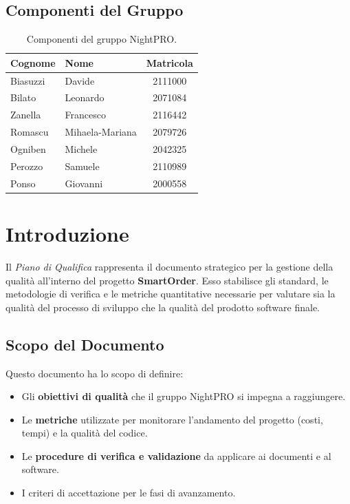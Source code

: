 \documentclass[a4paper,11pt,oneside]{scrartcl}
\begin{document}
\subsection*{Componenti del Gruppo}

\begin{table}[h!]
\centering
\renewcommand{\arraystretch}{1.2}
\begin{tabular}{@{}llc@{}}
\toprule
\textbf{Cognome} & \textbf{Nome} & \textbf{Matricola} \\
\midrule
Biasuzzi & Davide & 2111000 \\
Bilato & Leonardo & 2071084 \\
Zanella & Francesco & 2116442 \\
Romascu & Mihaela-Mariana & 2079726 \\
Ogniben & Michele & 2042325 \\
Perozzo & Samuele & 2110989 \\
Ponso & Giovanni & 2000558 \\
\bottomrule
\end{tabular}
\caption{Componenti del gruppo NightPRO.}
\end{table}

\newpage
\section{Introduzione}

Il \textit{Piano di Qualifica} rappresenta il documento strategico per la gestione della qualità all'interno del progetto \textbf{SmartOrder}. Esso stabilisce gli standard, le metodologie di verifica e le metriche quantitative necessarie per valutare sia la qualità del processo di sviluppo che la qualità del prodotto software finale.

\subsection{Scopo del Documento}
Questo documento ha lo scopo di definire:
\begin{itemize}
    \item Gli \textbf{obiettivi di qualità} che il gruppo NightPRO si impegna a raggiungere.
    \item Le \textbf{metriche} utilizzate per monitorare l'andamento del progetto (costi, tempi) e la qualità del codice.
    \item Le \textbf{procedure di verifica e validazione} da applicare ai documenti e al software.
    \item I criteri di accettazione per le fasi di avanzamento.
\end{itemize}
\end{document}

